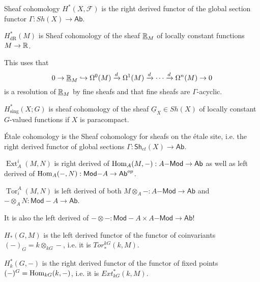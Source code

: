 \documentclass[fontsize=11pt,fleqn,a4paper]{scrartcl}
\begin{document}
\begin{example}
Sheaf cohomology $H^\ast(X,\mathcal{F})$ is the right derived functor of the global section functor $\Gamma: Sh(X) \to \mathsf{Ab}$.
\end{example}

\begin{example}
$H_\text{dR}^\ast(M)$ is Sheaf cohomology of the sheaf $\underline{\mathbb{R}}_M$ of locally constant functions $M\to\mathbb{R}$.

This uses that
\[0 \to \underline{\mathbb{R}}_M \hookrightarrow \Omega^0(M) \xrightarrow{d} \Omega^1(M) \xrightarrow{d} \cdots \xrightarrow{d} \Omega^n(M) \to 0\]
is a resolution of $\underline{\mathbb{R}}_M$ by fine sheafs and that fine sheafs are $\Gamma$-acyclic.
\end{example}

\begin{example}
$H_\text{sing}^\ast(X;G)$ is sheaf cohomology of the sheaf $\underline{G}_X\in Sh(X)$ of locally constant $G$-valued functions if $X$ is paracompact.
\end{example}

\begin{example}
Étale cohomology is the Sheaf cohomology for sheafs on the étale site, i.e. the right derived functor of global sections $\Gamma: \mathsf{Sh}_{et}(X) \to \mathsf{Ab}$.
\end{example}

\begin{example}
$\operatorname{Ext}_A^i(M,N)$ is right derived of $\operatorname{Hom}_A(M,-): A\mathsf{-Mod} \to \mathsf{Ab}$ as well as left derived of $\operatorname{Hom}_A(-,N): \mathsf{Mod-}A\to\mathsf{Ab}^{op}$.

$\operatorname{Tor}_i^A(M,N)$ is left derived of both $M\otimes_A -: A\mathsf{-Mod}\to\mathsf{Ab}$ and $ -\otimes_A N:\mathsf{Mod-}A\to\mathsf{Ab}$.

It is also the left derived of $-\otimes-: \mathsf{Mod-}A\times A\mathsf{-Mod}\to \mathsf{Ab}$!
\end{example}

\begin{example}
$H_\ast(G,M)$ is the left derived functor of the functor of coinvariants $(-)_G=k \otimes_{kG} -$, i.e. it is $Tor_\ast^{kG}(k,M)$.

$H_k^\ast(G,-)$ is the right derived functor of the functor of fixed points $(-)^G = \operatorname{Hom}_{kG}(k,-)$, i.e. it is $Ext_{kG}^\ast(k,M)$.
\end{example}
\end{document}
